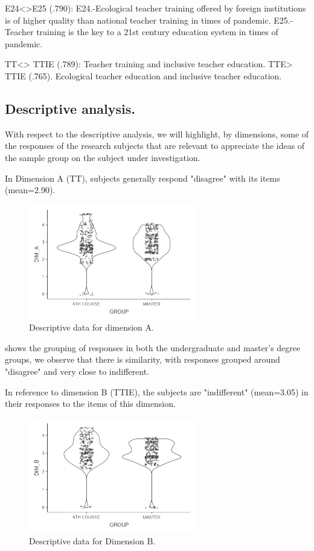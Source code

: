 \documentclass{textolivre}
\begin{document}
E24<>E25 (.790): E24.-Ecological teacher training offered by foreign institutions is of higher quality than national teacher training in times of pandemic. E25.-Teacher training is the key to a 21st century education system in times of pandemic.

TT<> TTIE (.789): Teacher training and inclusive teacher education. TTE> TTIE (.765). Ecological teacher education and inclusive teacher education.

\subsection{Descriptive analysis.}\label{subdescanaly}
With respect to the descriptive analysis, we will highlight, by dimensions, some of the responses of the research subjects that are relevant to appreciate the ideas of the sample group on the subject under investigation.

In Dimension A (TT), subjects generally respond "disagree" with its items (mean=2.90).

\begin{figure}[htbp]
 \centering
 \includegraphics[width=0.65\textwidth]{fig1.pdf}
 \caption{Descriptive data for dimension A.}
 \label{fig1}
\end{figure}

 shows the grouping of responses in both the undergraduate and master's degree groups, we observe that there is similarity, with responses grouped around "disagree" and very close to indifferent.

In reference to dimension B (TTIE), the subjects are "indifferent" (mean=3.05) in their responses to the items of this dimension.

\begin{figure}[htbp]
 \centering
 \includegraphics[width=0.65\textwidth]{fig2.pdf}
 \caption{Descriptive data for Dimension B.}
 \label{fig2}
\end{figure}
\end{document}
